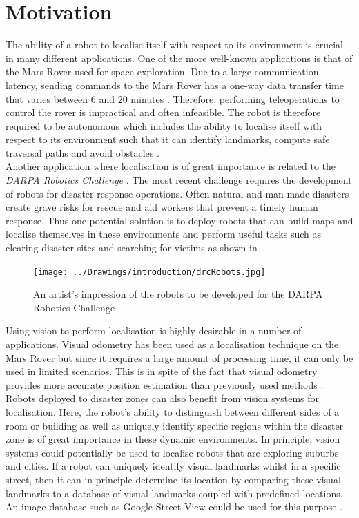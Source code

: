 \section{Motivation}
\label{sec:motivation}
The ability of a robot to localise itself with respect to its environment is crucial in many different applications. One of the more well-known applications is that of the Mars Rover used for space exploration. Due to a large communication latency, sending commands to the Mars Rover has a one-way data transfer time that varies between $6$ and $20$ minutes \citep{Powell2006}. Therefore, performing teleoperations to control the rover is impractical and often infeasible. The robot is therefore required to be autonomous which includes the ability to localise itself with respect to its environment such that it can identify landmarks, compute safe traversal paths and avoid obstacles \citep{Powell2006}.\\

Another application where localisation is of great importance is related to the \textit{DARPA Robotics Challenge} \citep{darpa2012}. The most recent challenge requires the development of robots for disaster-response operations. Often natural and man-made disasters create grave risks for rescue and aid workers that prevent a timely human response. Thus one potential solution is to deploy robots that can build maps and localise themselves in these environments and perform useful tasks such as clearing disaster sites and searching for victims as shown in .\\   

\begin{figure}[h!] 
  \centering
    \texttt{[image: ../Drawings/introduction/drcRobots.jpg]}
    \caption{An artist's impression of the robots to be developed for the DARPA Robotics Challenge \citep{darpa2012}}
    \label{fig:darpa}
\end{figure}

Using vision to perform localisation is highly desirable in a number of applications. Visual odometry has been used as a localisation technique on the Mars Rover \citep{Di2008} but since it requires a large amount of processing time, it can only be used in limited scenarios. This is in spite of the fact that visual odometry provides more accurate position estimation than previously used methods \citep{Powell2006}. Robots deployed to disaster zones can also benefit from vision systems for localisation. Here, the robot's ability to distinguish between different sides of a room or building as well as uniquely identify specific regions within the disaster zone is of great importance in these dynamic environments. In principle, vision systems could potentially be used to localise robots that are exploring suburbs and cities. If a robot can uniquely identify visual landmarks whilst in a specific street, then it can in principle determine its location by comparing these visual landmarks to a database of visual landmarks coupled with predefined locations. An image database such as Google Street View could be used for this purpose \citep{StreetView}.\\


